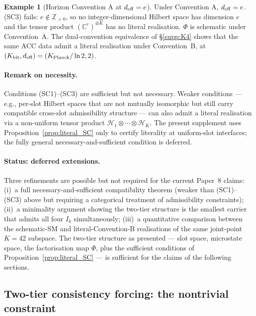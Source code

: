 \documentclass[11pt]{article}
\theoremstyle{plain}
\theoremstyle{definition}
\newtheorem{example}[theorem]{Example}
\theoremstyle{remark}
\begin{document}
\begin{example}[Horizon Convention A at $d_{\rm eff} = e$]\label{ex:sch_convA}
Under Convention A, $d_{\rm eff} = e$.  (SC3) fails: $e \notin \mathbb{Z}_{> 0}$, so no integer-dimensional Hilbert space has dimension $e$ and the tensor product $(\mathbb{C}^e)^{\otimes K}$ has no literal realisation.  $\Phi$ is schematic under Convention~A.  The dual-convention equivalence of \S\ref{supp:K4} shows that the same ACC data admit a literal realisation under Convention~B, at $(K_{\rm bit}, d_{\rm eff}) = (K_{\rm Planck}/\ln 2, 2)$.
\end{example}

\paragraph{Remark on necessity.}  Conditions (SC1)--(SC3) are sufficient but not necessary.  Weaker conditions --- e.g., per-slot Hilbert spaces that are not mutually isomorphic but still carry compatible cross-slot admissibility structure --- can also admit a literal realisation via a non-uniform tensor product $\mathcal{H}_1 \otimes \cdots \otimes \mathcal{H}_K$.  The present supplement uses Proposition~\ref{prop:literal_SC} only to certify literality at uniform-slot interfaces; the fully general necessary-and-sufficient condition is deferred.

\paragraph{Status: deferred extensions.}  Three refinements are possible but not required for the current Paper~8 claims:
(i)~a full necessary-and-sufficient compatibility theorem (weaker than (SC1)--(SC3) above but requiring a categorical treatment of admissibility constraints);
(ii)~a minimality argument showing the two-tier structure is the smallest carrier that admits all four $I_k$ simultaneously;
(iii)~a quantitative comparison between the schematic-SM and literal-Convention-B realisations of the same joint-point $K = 42$ subspace.
The two-tier structure as presented --- slot space, microstate space, the factorisation map $\Phi$, plus the sufficient conditions of Proposition~\ref{prop:literal_SC} --- is sufficient for the claims of the following sections.

\bigskip

\subsection{Two-tier consistency forcing: the nontrivial constraint}\label{supp:C4}
\end{document}
